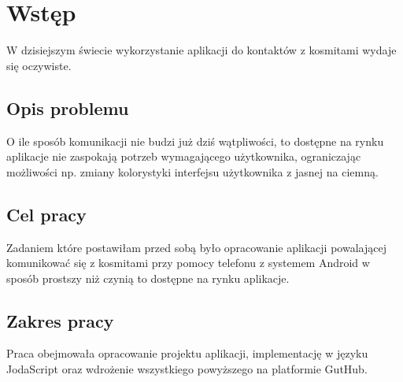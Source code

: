 \chapter*{Wstęp}

W dzisiejszym świecie wykorzystanie aplikacji do kontaktów z kosmitami wydaje się oczywiste. \lipsum[6]

\section*{Opis problemu}

O ile sposób komunikacji nie budzi już dziś wątpliwości, to dostępne na rynku aplikacje nie zaspokają potrzeb wymagającego użytkownika, ograniczając możliwości np. zmiany kolorystyki interfejsu użytkownika z jasnej na ciemną. \lipsum[8]

\section*{Cel pracy}

Zadaniem które postawiłam przed sobą było opracowanie aplikacji powalającej komunikować się z kosmitami przy pomocy telefonu z systemem Android w sposób prostszy niż czynią to dostępne na rynku aplikacje. \lipsum[8]

\section*{Zakres pracy}

Praca obejmowała opracowanie projektu aplikacji, implementację w języku JodaScript oraz wdrożenie wszystkiego powyższego na platformie GutHub. \lipsum[14]
